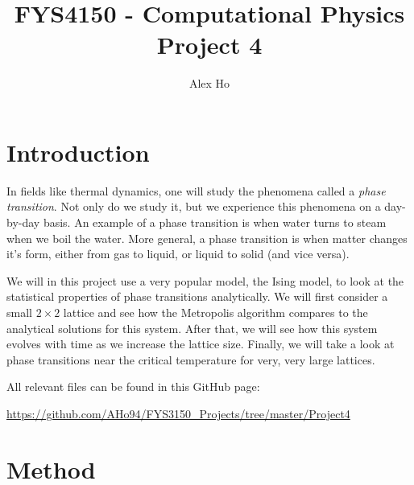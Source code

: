\documentclass[12pt]{article}
\author{Alex Ho}
\title{FYS4150 - Computational Physics \\ Project 4}
\begin{document}
\maketitle
\begin{abstract}

\end{abstract}
\newpage
\tableofcontents
\newpage
\section{Introduction} \label{section:intro}
In fields like thermal dynamics, one will study the phenomena called a \emph{phase transition}. Not only do we study it, but we experience this phenomena on a day-by-day basis. An example of a phase transition is when water turns to steam when we boil the water. More general, a phase transition is when matter changes it's form, either from gas to liquid, or liquid to solid (and vice versa).

We will in this project use a very popular model, the Ising model, to look at the statistical properties of phase transitions analytically. We will first consider a small $2\times 2$ lattice and see how the Metropolis algorithm compares to the analytical solutions for this system. After that, we will see how this system evolves with time as we increase the lattice size. Finally, we will take a look at phase transitions near the critical temperature for very, very large lattices.

All relevant files can be found in this GitHub page:

\url{https://github.com/AHo94/FYS3150_Projects/tree/master/Project4}


\section{Method} \label{section:methods}
\end{document}
